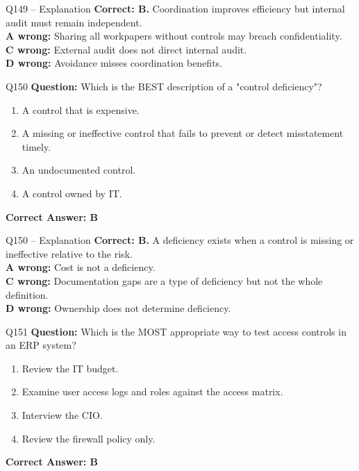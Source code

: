 \documentclass[aspectratio=169,10pt]{beamer}
\begin{document}
	\begin{frame}[t]{Q149 -- Explanation}
		\small
		\textbf{Correct: B.} Coordination improves efficiency but internal audit must remain independent. \\[4pt]
		\textbf{A wrong:} Sharing all workpapers without controls may breach confidentiality. \\[2pt]
		\textbf{C wrong:} External audit does not direct internal audit. \\[2pt]
		\textbf{D wrong:} Avoidance misses coordination benefits.
	\end{frame}
	
	\begin{frame}[t]{Q150}
		\small
		\textbf{Question:} Which is the BEST description of a "control deficiency"?
		\begin{enumerate}[label=\Alph*.,itemsep=1pt,topsep=2pt]
			\item A control that is expensive.
			\item A missing or ineffective control that fails to prevent or detect misstatement timely.
			\item An undocumented control.
			\item A control owned by IT.
		\end{enumerate}
		\vspace{4pt}
		\textbf{Correct Answer: B}
	\end{frame}
	
	\begin{frame}[t]{Q150 -- Explanation}
		\small
		\textbf{Correct: B.} A deficiency exists when a control is missing or ineffective relative to the risk. \\[4pt]
		\textbf{A wrong:} Cost is not a deficiency. \\[2pt]
		\textbf{C wrong:} Documentation gaps are a type of deficiency but not the whole definition. \\[2pt]
		\textbf{D wrong:} Ownership does not determine deficiency.
	\end{frame}
	
	\begin{frame}[t]{Q151}
		\small
		\textbf{Question:} Which is the MOST appropriate way to test access controls in an ERP system?
		\begin{enumerate}[label=\Alph*.,itemsep=1pt,topsep=2pt]
			\item Review the IT budget.
			\item Examine user access logs and roles against the access matrix.
			\item Interview the CIO.
			\item Review the firewall policy only.
		\end{enumerate}
		\vspace{4pt}
		\textbf{Correct Answer: B}
	\end{frame}
	
\end{document}
